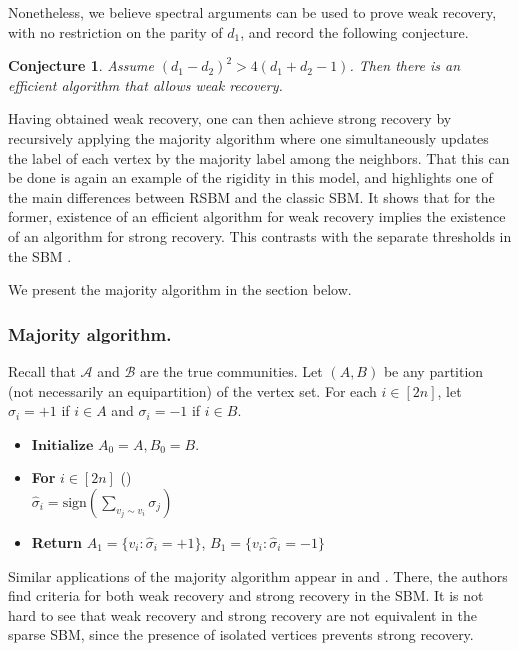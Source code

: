 \documentclass[11pt,reqno]{amsart}
\newtheorem{conjecture}{Conjecture}
\begin{document}
Nonetheless, we believe spectral arguments can be used to prove weak recovery, with no restriction on the parity of $d_1$, and record the following conjecture.  
\begin{conjecture}\label{weakpart1}
Assume  $(d_1-d_2)^2>4(d_1+d_2-1)$. Then there is an efficient algorithm that allows weak recovery.
\end{conjecture}

Having obtained weak recovery, one can then achieve strong recovery by recursively applying the majority algorithm where one simultaneously updates the label of each vertex by the majority label among the neighbors. That this can be done is again an example of the rigidity in this model, and highlights one of the main differences between RSBM and the classic SBM. It shows that for the former, existence of an efficient algorithm for weak recovery implies the existence of an algorithm for strong recovery. This contrasts with the separate thresholds in the SBM \cite{MNS14}.

We present the majority algorithm in the section below.

\subsubsection{Majority algorithm.}\label{ma1}
Recall that $\mathcal{A}$ and $\mathcal{B}$ are the true
communities. Let $(A,B)$ be any partition (not necessarily an
equipartition) of the vertex set. For each $i \in [2n]$, let $\sigma_i=+1$ if $i\in A$ and $\sigma_i=-1$ if $i\in B$. 
\begin{itemize}
 \item [] $\mathbf{Initialize}$ $A_0=A, B_0=B$.
 \item [] \textbf{For} $i\in [2n]$  ()\\
									           $\hat \sigma_i=\text{sign}(\displaystyle{\sum_{v_j\sim v_i}\sigma_j})$
 \item[]	\textbf{Return} $A_1=\{v_i: \hat \sigma_i=+1\}$, $B_1=\{v_i: \hat \sigma_i=-1\}$		
\end{itemize}


Similar applications of the majority algorithm appear in \cite{abbe2014exact} and \cite{MNS14}. There, the authors find criteria for both weak recovery and strong recovery in the SBM. It is not hard to see that weak
recovery and strong recovery are not equivalent  in the sparse SBM,
since the presence of isolated vertices prevents strong recovery. 
\end{document}
